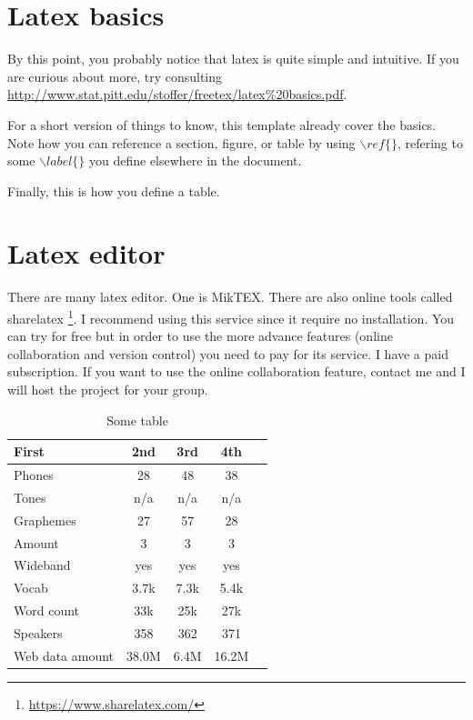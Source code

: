 \documentclass{article}
\begin{document}
\section{Latex basics}
\label{sec:latex}

By this point, you probably notice that latex is quite simple and intuitive. If you are curious about more, try consulting \url{http://www.stat.pitt.edu/stoffer/freetex/latex%20basics.pdf}.

For a short version of things to know, this template already cover the basics. Note how you can reference a section, figure, or table by using $\backslash ref\{\}$, refering to some $\backslash label\{\}$ you define elsewhere in the document.

Finally, this is how you define a table.

\section{Latex editor}

There are many latex editor. One is MikTEX. There are also online tools called sharelatex \footnote{\url{https://www.sharelatex.com/}}. I recommend using this service since it require no installation. You can try for free but in order to use the more advance features (online collaboration and version control) you need to pay for its service. I have a paid subscription. If you want to use the online collaboration feature, contact me and I will host the project for your group.

\begin{table}
\centering
\begin{tabular}{|l|c|c|c|c|} %
 \hline %
First & 2nd & 3rd & 4th \\ %
 \hline
 Phones & 28 & 48 & 38 \\
 Tones & n/a & n/a & n/a \\
 Graphemes & 27 & 57 & 28 \\
 Amount & 3 & 3 & 3 \\
 Wideband & yes & yes & yes \\
 Vocab & 3.7k & 7.3k & 5.4k \\
 Word count & 33k & 25k & 27k \\
 Speakers & 358 & 362 & 371 \\
 Web data amount & 38.0M & 6.4M & 16.2M \\
 \hline
\end{tabular}
\caption{Some table}
\label{tab:table}
\end{table}



\end{document}
